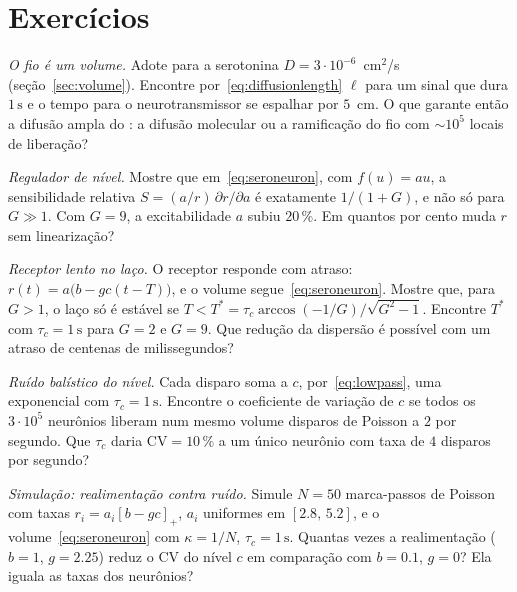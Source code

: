 \section{Exercícios}

\begin{exercise}[\lvlA]
\label{ex:05:1}
\emph{O fio é um volume.} Adote para a serotonina $D=3\cdot10^{-6}$~cm$^2$/s (seção~\ref{sec:volume}). Encontre por~\eqref{eq:diffusionlength} $\ell$ para um sinal que dura $1\,\text{s}$ e o tempo para o neurotransmissor se espalhar por $5$~cm. O que garante então a difusão ampla do : a difusão molecular ou a ramificação do fio com $\sim10^5$ locais de liberação?
\end{exercise}

\begin{exercise}[\lvlA]
\label{ex:05:2}
\emph{Regulador de nível.} Mostre que em~\eqref{eq:seroneuron}, com $f(u)=au$, a sensibilidade relativa $S=(a/r)\,\partial r/\partial a$ é exatamente $1/(1+G)$, e não só para $G\gg1$. Com $G=9$, a excitabilidade $a$ subiu $20\,\%$. Em quantos por cento muda $r$ sem linearização?
\end{exercise}

\begin{exercise}[\lvlB]
\label{ex:05:3}
\emph{Receptor lento no laço.} O receptor  responde com atraso: $r(t)=a\bigl(b-gc(t-T)\bigr)$, e o volume segue~\eqref{eq:seroneuron}. Mostre que, para $G>1$, o laço só é estável se $T<T^*=\tau_c\arccos(-1/G)/\sqrt{G^2-1}$. Encontre $T^*$ com $\tau_c=1\,\text{s}$ para $G=2$ e $G=9$. Que redução da dispersão é possível com um atraso de centenas de milissegundos?
\end{exercise}

\begin{exercise}[\lvlB]
\label{ex:05:4}
\emph{Ruído balístico do nível.} Cada disparo soma a $c$, por~\eqref{eq:lowpass}, uma exponencial com $\tau_c=1\,\text{s}$. Encontre o coeficiente de variação de $c$ se todos os $3\cdot10^5$ neurônios  liberam num mesmo volume disparos de Poisson a $2$ por segundo. Que $\tau_c$ daria $\mathrm{CV}=10\,\%$ a um único neurônio com taxa de $4$ disparos por segundo?
\end{exercise}

\begin{exercise}[\lvlB]
\label{ex:05:5}
\emph{Simulação: realimentação contra ruído.} Simule $N=50$ marca-passos de Poisson com taxas $r_i=a_i[b-gc]_+$, $a_i$ uniformes em $[2.8,\,5.2]$, e o volume~\eqref{eq:seroneuron} com $\kappa=1/N$, $\tau_c=1\,\text{s}$. Quantas vezes a realimentação ($b=1$, $g=2.25$) reduz o CV do nível $c$ em comparação com $b=0.1$, $g=0$? Ela iguala as taxas dos neurônios?
\end{exercise}

